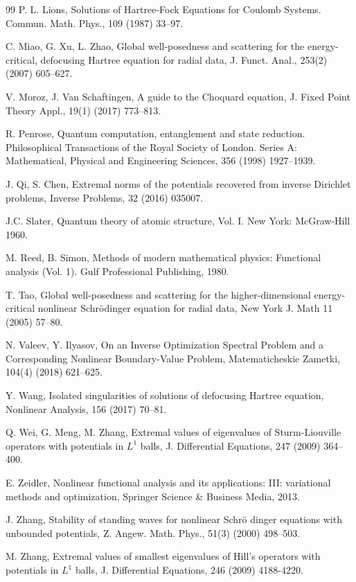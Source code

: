 \documentclass[12pt,thmsa]{article}
\begin{document}
\begin{thebibliography}{99}
 P. L. Lions, Solutions of Hartree-Fock Equations for
Coulomb Systems. Commun. Math. Phys., 109 (1987) 33--97.

 C. Miao, G. Xu, L. Zhao, Global well-posedness and
scattering for the energy-critical, defocusing Hartree equation for radial
data, J. Funct. Anal., 253(2) (2007) 605--627.

 V. Moroz, J. Van Schaftingen, A guide to the Choquard
equation, J. Fixed Point Theory Appl., 19(1) (2017) 773--813.

 R. Penrose, Quantum computation, entanglement and state
reduction. Philosophical Transactions of the Royal Society of London. Series
A: Mathematical, Physical and Engineering Sciences, 356 (1998) 1927--1939.

 J. Qi, S. Chen, Extremal norms of the potentials recovered from
inverse Dirichlet problems, Inverse Problems, 32 (2016) 035007.

 J.C. Slater, Quantum theory of atomic structure, Vol. I.
New York: McGraw-Hill 1960.

 M. Reed, B. Simon, Methods of modern mathematical
physics: Functional analysis (Vol. 1). Gulf Professional Publishing, 1980.

 T. Tao, Global well-posedness and scattering for the
higher-dimensional energy-critical nonlinear Schr\"{o}dinger equation for
radial data, New York J. Math 11 (2005) 57--80.

 N. Valeev, Y. Ilyasov, On an Inverse Optimization
Spectral Problem and a Corresponding Nonlinear Boundary-Value Problem,
Matematicheskie Zametki, 104(4) (2018) 621--625.

 Y. Wang, Isolated singularities of solutions of defocusing
Hartree equation, Nonlinear Analysis, 156 (2017) 70--81.

 Q. Wei, G. Meng, M. Zhang, Extremal values of eigenvalues of
Sturm-Liouville operators with potentials in $L^{1}$ balls, J. Differential
Equations, 247 (2009) 364--400.

 E. Zeidler, Nonlinear functional analysis and its
applications: III: variational methods and optimization, Springer Science \&
Business Media, 2013.

 J. Zhang, Stability of standing waves for nonlinear Schr\"{o}%
dinger equations with unbounded potentials, Z. Angew. Math. Phys., 51(3)
(2000) 498--503.

 M. Zhang, Extremal values of smallest eigenvalues of Hill's
operators with potentials in $L^{1}$ balls, J. Differential Equations, 246
(2009) 4188-4220.
\end{thebibliography}
\end{document}

